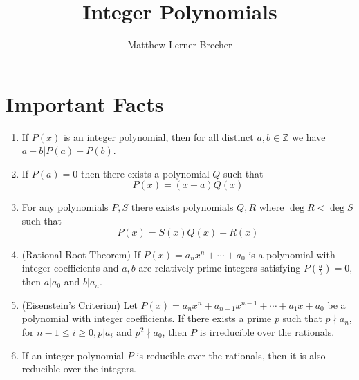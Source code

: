 \documentclass[11pt]{article}
\theoremstyle{theorem}
\theoremstyle{definition}
\theoremstyle{remark}
\theoremstyle{definition}
\theoremstyle{remark}
\newcommand{\bb}[1]{\mathbb{#1}}
\begin{document}
\title{Integer Polynomials}
\author{Matthew Lerner-Brecher}
\maketitle

\section{Important Facts}
\begin{enumerate}
\item If $P(x)$ is an integer polynomial, then for all distinct $a,b\in\bb{Z}$ we have $a-b|P(a)-P(b)$.
\item If $P(a)=0$ then there exists a polynomial $Q$ such that 
\[P(x)=(x-a)Q(x)\]
\item For any polynomials $P,S$ there exists polynomials $Q,R$ where $\deg R < \deg S$ such that 
\[P(x)=S(x)Q(x)+R(x)\]
\item (Rational Root Theorem) If $P(x)=a_nx^n+\cdots+a_0$ is a polynomial with integer coefficients and $a,b$ are relatively prime integers satisfying $P(\frac{a}{b})=0$, then $a|a_0$ and $b|a_n$.
\item (Eisenstein's Criterion) Let $P(x)=a_nx^n+a_{n-1}x^{n-1}+\cdots+a_1x+a_0$ be a polynomial with integer coefficients. If there exists a prime $p$ such that $p\nmid a_n$, for $n-1\le i\ge0,  p|a_i$ and $p^2\nmid a_0$, then $P$ is irreducible over the rationals.
\item If an integer polynomial $P$ is reducible over the rationals, then it is also reducible over the integers.
\end{enumerate}
\end{document}
